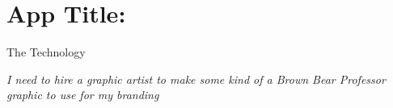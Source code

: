 \section{App Title:}

The Technology

\emph{I need to hire a graphic artist to make some kind of a Brown Bear Professor graphic to use for my branding}